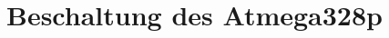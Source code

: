 \documentclass[12pt,journal]{IEEEtran}
\begin{document}
%
%

%
%



\section{Beschaltung des Atmega328p}

%
\end{document}

